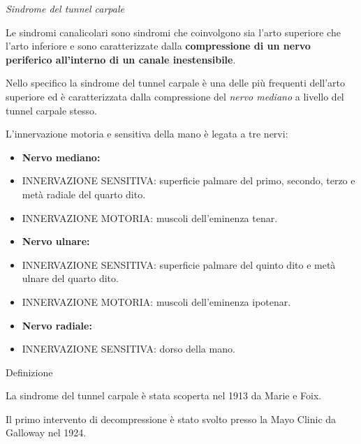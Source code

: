 \documentclass[]{article}
\date{}
\begin{document}
\emph{Sindrome del tunnel carpale}

Le sindromi canalicolari sono sindromi che coinvolgono sia l'arto
superiore che l'arto inferiore e sono caratterizzate dalla
\textbf{compressione di un nervo periferico all'interno di un canale
inestensibile}.

Nello specifico la sindrome del tunnel carpale è una delle più frequenti
dell'arto superiore ed è caratterizzata dalla compressione del
\emph{nervo mediano} a livello del tunnel carpale stesso.

L'innervazione motoria e sensitiva della mano è legata a tre nervi:

\begin{itemize}
\item
  \textbf{Nervo mediano:}
\end{itemize}

\begin{itemize}
\item
  INNERVAZIONE SENSITIVA: superficie palmare del primo, secondo, terzo e
  metà radiale del quarto dito.
\item
  INNERVAZIONE MOTORIA: muscoli dell'eminenza tenar.
\end{itemize}

\begin{itemize}
\item
  \textbf{Nervo ulnare:}
\end{itemize}

\begin{itemize}
\item
  INNERVAZIONE SENSITIVA: superficie palmare del quinto dito e metà
  ulnare del quarto dito.
\item
  INNERVAZIONE MOTORIA: muscoli dell'eminenza ipotenar.
\end{itemize}

\begin{itemize}
\item
  \textbf{Nervo radiale:}
\end{itemize}

\begin{itemize}
\item
  INNERVAZIONE SENSITIVA: dorso della mano.
\end{itemize}

Definizione

La sindrome del tunnel carpale è stata scoperta nel 1913 da Marie e
Foix.

Il primo intervento di decompressione è stato svolto presso la Mayo
Clinic da Galloway nel 1924.
\end{document}
